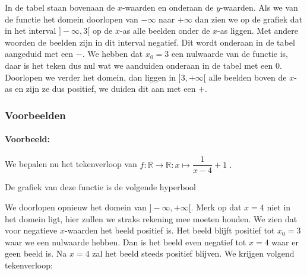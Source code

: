 \documentclass[12pt,a4paper,twoside]{article}
\begin{document}
In de tabel staan bovenaan de $x$-waarden en onderaan de $y$-waarden. Als we van de functie het domein doorlopen van $-\infty$ naar $+\infty$ dan zien we op de grafiek dat in het interval $]-\infty,3[$ op de $x$-as alle beelden onder de $x$-as liggen. Met andere woorden de beelden zijn in dit interval negatief. Dit wordt onderaan in de tabel aangeduid met een $-$. We hebben dat $x_0=3$ een nulwaarde van de functie is, daar is het teken dus nul wat we aanduiden onderaan in de tabel met een $0$. Doorlopen we verder het domein, dan liggen in $]3,+\infty[$ alle beelden boven de $x$-as en zijn ze dus positief, we duiden dit aan met een $+$.

\subsubsection*{Voorbeelden}

\paragraph{Voorbeeld:} We bepalen nu het tekenverloop van $f:\mathbb{R}\to\mathbb{R}:x\mapsto \dfrac{1}{x-4}+1\;.$

De grafiek van deze functie is de volgende hyperbool
\begin{center}
\end{center}

We doorlopen opnieuw het domein van $]-\infty, +\infty[$. Merk op dat $x=4$ niet in het domein ligt, hier zullen we straks rekening mee moeten houden. We zien dat voor negatieve $x$-waarden het beeld positief is. Het beeld blijft positief tot $x_0=3$ waar we een nulwaarde hebben. Dan is het beeld even negatief tot $x=4$ waar er geen beeld is. Na $x=4$ zal het beeld steeds positief blijven. We krijgen volgend tekenverloop:
\end{document}
